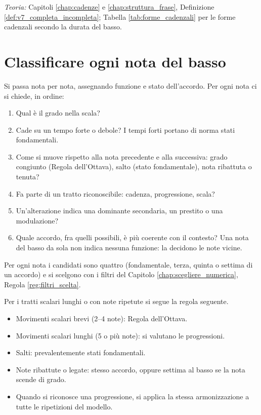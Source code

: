 \textit{Teoria:} Capitoli \ref{chap:cadenze} e \ref{chap:struttura_frase}, Definizione \ref{def:v7_completa_incompleta}; Tabella \ref{tab:forme_cadenzali} per le forme cadenzali secondo la durata del basso.

\section{Classificare ogni nota del basso}
\label{sec:fase3_numerato}

Si passa nota per nota, assegnando funzione e stato dell'accordo. Per ogni nota ci si chiede, in ordine:
\begin{enumerate}
	\item Qual è il grado nella scala?
	\item Cade su un tempo forte o debole? I tempi forti portano di norma stati fondamentali.
	\item Come si muove rispetto alla nota precedente e alla successiva: grado congiunto (Regola dell'Ottava), salto (stato fondamentale), nota ribattuta o tenuta?
	\item Fa parte di un tratto riconoscibile: cadenza, progressione, scala?
	\item Un'alterazione indica una dominante secondaria, un prestito o una modulazione?
	\item Quale accordo, fra quelli possibili, è più coerente con il contesto? Una nota del basso da sola non indica nessuna funzione: la decidono le note vicine.
\end{enumerate}

Per ogni nota i candidati sono quattro (fondamentale, terza, quinta o settima di un accordo) e si scelgono con i filtri del Capitolo \ref{chap:scegliere_numerica}, Regola \ref{reg:filtri_scelta}.

Per i tratti scalari lunghi o con note ripetute si segue la regola seguente.

\begin{regola}
	\label{reg:strategia-armonizzazione}
	\begin{itemize}
		\item Movimenti scalari brevi (2--4 note): Regola dell'Ottava.
		\item Movimenti scalari lunghi (5 o più note): si valutano le progressioni.
		\item Salti: prevalentemente stati fondamentali.
		\item Note ribattute o legate: stesso accordo, oppure settima al basso se la nota scende di grado.
		\item Quando si riconosce una progressione, si applica la stessa armonizzazione a tutte le ripetizioni del modello.
	\end{itemize}
\end{regola}

